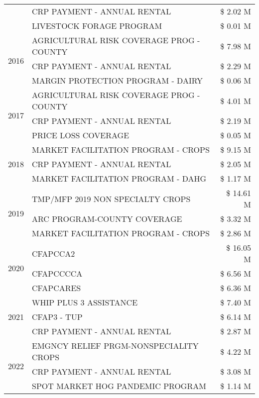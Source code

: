\begin{tabular}{llr}
 & CRP PAYMENT - ANNUAL RENTAL & \$ 2.02 M \\
 & LIVESTOCK FORAGE PROGRAM & \$ 0.01 M \\
\cline{1-3}
\multirow[t]{3}{*}{2016} & AGRICULTURAL RISK COVERAGE PROG - COUNTY & \$ 7.98 M \\
 & CRP PAYMENT - ANNUAL RENTAL & \$ 2.29 M \\
 & MARGIN PROTECTION PROGRAM - DAIRY & \$ 0.06 M \\
\cline{1-3}
\multirow[t]{3}{*}{2017} & AGRICULTURAL RISK COVERAGE PROG - COUNTY & \$ 4.01 M \\
 & CRP PAYMENT - ANNUAL RENTAL & \$ 2.19 M \\
 & PRICE LOSS COVERAGE & \$ 0.05 M \\
\cline{1-3}
\multirow[t]{3}{*}{2018} & MARKET FACILITATION PROGRAM - CROPS & \$ 9.15 M \\
 & CRP PAYMENT - ANNUAL RENTAL & \$ 2.05 M \\
 & MARKET FACILITATION PROGRAM - DAHG & \$ 1.17 M \\
\cline{1-3}
\multirow[t]{3}{*}{2019} & TMP/MFP 2019 NON SPECIALTY CROPS & \$ 14.61 M \\
 & ARC PROGRAM-COUNTY COVERAGE & \$ 3.32 M \\
 & MARKET FACILITATION PROGRAM - CROPS & \$ 2.86 M \\
\cline{1-3}
\multirow[t]{3}{*}{2020} & CFAPCCA2 & \$ 16.05 M \\
 & CFAPCCCCA & \$ 6.56 M \\
 & CFAPCARES & \$ 6.36 M \\
\cline{1-3}
\multirow[t]{3}{*}{2021} & WHIP PLUS 3 ASSISTANCE & \$ 7.40 M \\
 & CFAP3 - TUP & \$ 6.14 M \\
 & CRP PAYMENT - ANNUAL RENTAL & \$ 2.87 M \\
\cline{1-3}
\multirow[t]{3}{*}{2022} & EMGNCY RELIEF PRGM-NONSPECIALITY CROPS & \$ 4.22 M \\
 & CRP PAYMENT - ANNUAL RENTAL & \$ 3.08 M \\
 & SPOT MARKET HOG PANDEMIC PROGRAM & \$ 1.14 M \\
\cline{1-3}
\bottomrule
\end{tabular}
